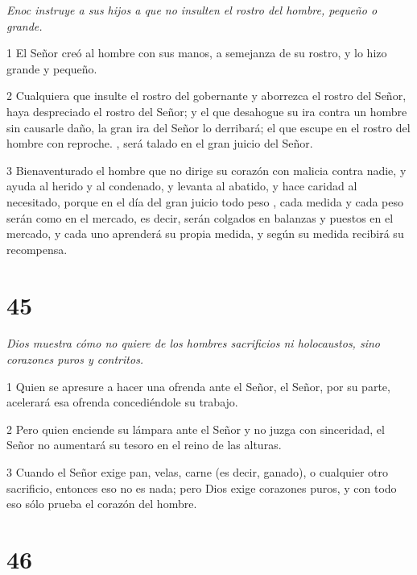 \par \textit{Enoc instruye a sus hijos a que no insulten el rostro del hombre, pequeño o grande.}

\par 1 El Señor creó al hombre con sus manos, a semejanza de su rostro, y lo hizo grande y pequeño.

\par 2 Cualquiera que insulte el rostro del gobernante y aborrezca el rostro del Señor, haya despreciado el rostro del Señor; y el que desahogue su ira contra un hombre sin causarle daño, la gran ira del Señor lo derribará; el que escupe en el rostro del hombre con reproche. , será talado en el gran juicio del Señor.

\par 3 Bienaventurado el hombre que no dirige su corazón con malicia contra nadie, y ayuda al herido y al condenado, y levanta al abatido, y hace caridad al necesitado, porque en el día del gran juicio todo peso , cada medida y cada peso serán como en el mercado, es decir, serán colgados en balanzas y puestos en el mercado, y cada uno aprenderá su propia medida, y según su medida recibirá su recompensa.



\chapter{45}

\par \textit{Dios muestra cómo no quiere de los hombres sacrificios ni holocaustos, sino corazones puros y contritos.}

\par 1 Quien se apresure a hacer una ofrenda ante el Señor, el Señor, por su parte, acelerará esa ofrenda concediéndole su trabajo.

\par 2 Pero quien enciende su lámpara ante el Señor y no juzga con sinceridad, el Señor no aumentará su tesoro en el reino de las alturas.

\par 3 Cuando el Señor exige pan, velas, carne (es decir, ganado), o cualquier otro sacrificio, entonces eso no es nada; pero Dios exige corazones puros, y con todo eso sólo prueba el corazón del hombre.

\chapter{46}

